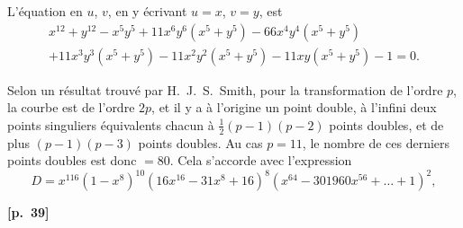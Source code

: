 \documentclass[11pt,a4paper]{book}
\begin{document}
L'\'equation en $u$, $v$, en y \'ecrivant $u = x$, $v = y$, est
\begin{multline*}
x^{12} + y^{12} - x^5 y^5 + 11x^6 y^6 (x^5 + y^5) - 66x^4 y^4 (x^5 + y^5)\\
+ 11x^3 y^3 (x^5 + y^5) - 11x^2 y^2 (x^5 + y^5) - 11xy(x^5 + y^5) - 1 = 0.
\end{multline*}

Selon un r\'esultat trouv\'e par H.\ J.\ S.\ Smith, pour la transformation de l'ordre $p$, la courbe est de l'ordre $2p$, et il y a \`a l'origine un point double, \`a l'infini deux points singuliers \'equivalents chacun \`a $\frac{1}{2}(p - 1)(p - 2)$ points doubles, et de plus $(p - 1)(p - 3)$ points doubles. Au cas $p = 11$, le nombre de ces derniers points doubles est donc $= 80$. Cela s'accorde avec l'expression
$$
D = x^{116}(1 - x^8)^{10}(16x^{16} - 31x^8 + 16)^8(x^{64} - 301960x^{56} + \ldots + 1)^2,
$$

\vspace{0.5em}
\noindent\textbf{[p.\ 39]}
\end{document}

